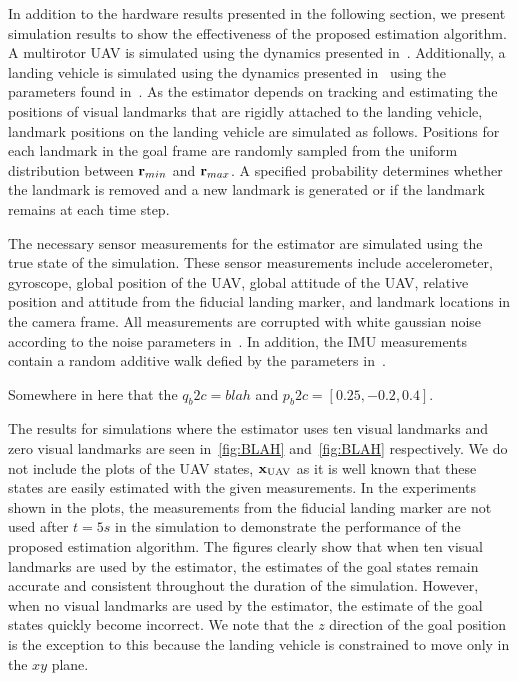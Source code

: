
In addition to the hardware results presented in the following section, we
present simulation results to show the effectiveness of the proposed estimation
algorithm.
A multirotor UAV is simulated using the dynamics presented in~.
Additionally, a landing vehicle is simulated using the dynamics presented
in~ using the parameters found
in~. As the estimator depends on
tracking and estimating the positions of visual landmarks that are rigidly
attached to the landing vehicle, landmark positions on the landing vehicle
are simulated as follows.
Positions for each landmark in the goal frame are
randomly sampled from the
uniform distribution between $\boldsymbol{\mathrm{r}}_{min}$ and $\boldsymbol{\mathrm{r}}_{max}$. A specified probability determines
whether the landmark is removed and a new landmark is generated or if the landmark
remains at each time step.

The necessary sensor measurements for the estimator are simulated using the true
state of the simulation. These sensor measurements include accelerometer,
gyroscope, global position of the UAV, global attitude 
of the UAV, relative position and attitude from the fiducial landing marker, and
landmark locations in the camera frame. All measurements are
corrupted with white gaussian noise according to the noise parameters
in~. In addition, the IMU measurements contain a random
additive walk defied by the parameters in~.

Somewhere in here that the $q_b2c = blah$ and $p_b2c = [0.25, -0.2, 0.4]$.

The results for simulations where the estimator uses ten visual landmarks and
zero visual landmarks are seen in~\ref{fig:BLAH} and~\ref{fig:BLAH}
respectively. We do not include the plots of the UAV states,
$\boldsymbol{\mathrm{x}}_{\text{UAV}}$ as it is well known that these states are easily
estimated with the given measurements. In the experiments shown in the plots,
the measurements from the fiducial landing marker are not used after $t = 5 s$
in the simulation to demonstrate the performance of the proposed estimation
algorithm. The figures clearly show that when ten visual landmarks are used by
the estimator, the estimates of the goal states remain accurate and consistent
throughout the duration of the simulation. However, when no visual landmarks are
used by the estimator, the estimate of the goal states quickly become incorrect.
We note that the $z$ direction of the goal position is the exception to this
because the landing vehicle is constrained to move only in the $xy$ plane.

